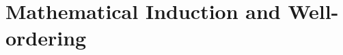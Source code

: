 \graphicspath{{5induction/asy/}}
\section{Mathematical Induction and Well-ordering}\label{chap:induction}


%   
%     
  
%     

